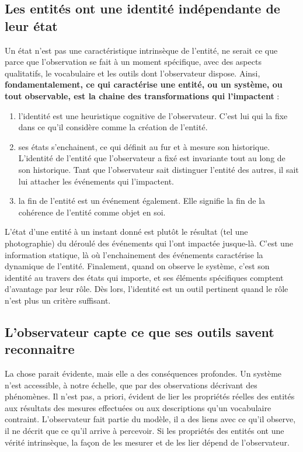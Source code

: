 \documentclass[11pt]{article}
\begin{document}
	\subsection{Les entités ont une identité indépendante de leur état}
	
	Un état n'est pas une caractéristique intrinsèque de l'entité, ne serait ce que parce que l'observation se fait à un moment spécifique, avec des aspects qualitatifs, le vocabulaire et les outils dont l'observateur dispose. Ainsi, \textbf{fondamentalement, ce qui caractérise une entité, ou un système, ou tout observable, est la chaine des transformations qui l'impactent} : 
	\begin{enumerate}
		\item l'identité est une heuristique cognitive de l'observateur. C'est lui qui la fixe dans ce qu'il considère comme la création de l'entité. 
		\item ses états s'enchainent, ce qui définit au fur et à mesure son historique. L'identité de l'entité que l'observateur a fixé est invariante tout au long de son historique. Tant que l'observateur sait distinguer l'entité des autres, il sait lui attacher les événements qui l'impactent. 
		\item la fin de l'entité est un événement également. Elle signifie la fin de la cohérence de l'entité comme objet en soi. 
	\end{enumerate}
	
	L'état d'une entité à un instant donné est plutôt le résultat (tel une photographie) du déroulé des événements qui l'ont impactée jusque-là. C'est une information statique, là où l'enchainement des événements caractérise la dynamique de l'entité. Finalement, quand on observe le système, c'est son identité au travers des états qui importe, et ses éléments spécifiques comptent d'avantage par leur rôle. Dès lors, l'identité est un outil pertinent quand le rôle n'est plus un critère suffisant. 

	\subsection{L'observateur capte ce que ses outils savent reconnaitre}
	
	La chose parait évidente, mais elle a des conséquences profondes. Un système n'est accessible, à notre échelle, que par des observations décrivant des phénomènes. Il n'est pas, a priori, évident de lier les propriétés réelles des entités aux résultats des mesures effectuées ou aux descriptions qu'un vocabulaire contraint. L'observateur fait partie du modèle, il a des liens avec ce qu'il observe, il ne décrit que ce qu'il arrive à percevoir. Si les propriétés des entités ont une vérité intrinsèque, la façon de les mesurer et de les lier dépend de l'observateur. 
	
\end{document}
